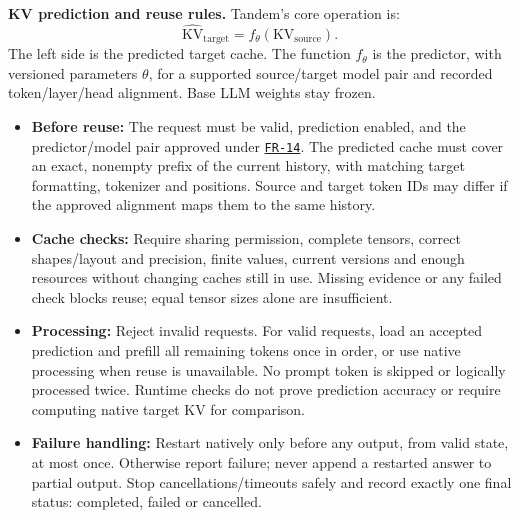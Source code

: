 \documentclass[12pt]{article}
\begin{document}
\par\medskip\noindent{}\label{sec:formal}
\textbf{KV prediction and reuse rules.}
Tandem's core operation is:
\[
 \widehat{\mathrm{KV}}_{\mathrm{target}}
 = f_\theta(\mathrm{KV}_{\mathrm{source}}).
\]
The left side is the predicted target cache. The function $f_\theta$ is the
predictor, with versioned parameters $\theta$, for a supported source/target
model pair and recorded token/layer/head alignment. Base LLM weights stay frozen.

\begin{itemize}
\item \textbf{Before reuse:} The request must be valid, prediction enabled,
and the predictor/model pair approved under
\hyperref[req:FR-14]{\texttt{FR-14}}. The predicted cache must cover an exact,
nonempty prefix of the current history, with matching target formatting,
tokenizer and positions. Source and target token IDs may differ if the
approved alignment maps them to the same history.
\item \textbf{Cache checks:} Require sharing permission, complete tensors,
correct shapes/layout and precision, finite values, current versions and
enough resources without changing caches still in use. Missing evidence or
any failed check blocks reuse; equal tensor sizes alone are insufficient.
\item \textbf{Processing:} Reject invalid requests. For valid requests,
load an accepted prediction and prefill all remaining tokens once in order,
or use native processing when reuse is unavailable. No prompt token is
skipped or logically processed twice. Runtime checks do not prove prediction
accuracy or require computing native target KV for comparison.
\item \textbf{Failure handling:} Restart natively only before any output,
from valid state, at most once. Otherwise report failure;
never append a restarted answer to partial output. Stop cancellations/timeouts
safely and record exactly one final status: completed, failed or cancelled.
\end{itemize}
\end{document}
